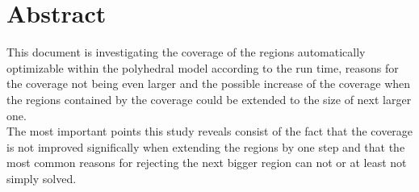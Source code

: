 \begingroup
\let\clearpage\relax
\let\cleardoublepage\relax
\let\cleardoublepage\relax

\chapter*{Abstract}
This document is investigating the coverage of the regions automatically optimizable within the polyhedral model according to the run time, reasons for the coverage not being even larger and the possible increase of the coverage when the regions contained by the coverage could be extended to the size of next larger one.\\
The most important points this study reveals consist of the fact that the coverage is not improved significally when extending the regions by one step and that the most common reasons for rejecting the next bigger region can not or at least not simply solved.
\begin{comment}
    \begin{itemize}
        \item Plakative Stichworte
        \item Kalauer?
        \item Ausblick
        \item Ergebnis
    \end{itemize}
\draftnote{
    \begin{itemize}
        \item Background: Give a brief introducing notice about the motivation for conducting the study.
        \item Objective: Describe the aim of the study, including the object under examination, the focus, and the perspective.
        \item Method: Describe which research method was used to examine the object (e.g., experimental design, number and kind of participants, selection criteria, data collection and analysis procedures).
        \item Results: Describe the main findings.
        \item Limitations: Describe the major limitations of the research, if any.
        \item Conclusion: Describe the impact of the results.
        \item lengths:
            \begin{itemize}
                \item background: one sentence
                \item important elements: objective, method, result and conclusion
            \end{itemize}
        \item keywords
    \end{itemize}
}
\end{comment}

